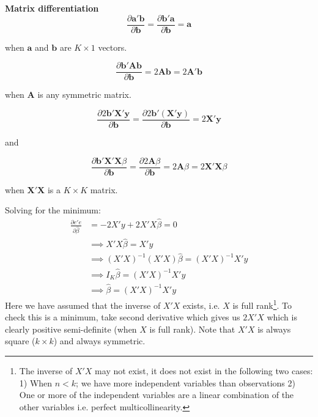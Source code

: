\documentclass[DIV=14,titlepage=false]{scrreprt}
\begin{document}
\begin{note}
    \textbf{Matrix differentiation}
\begin{equation}
\frac{\partial \mathbf{a}' \mathbf{b}}{\partial \mathbf{b}} = \frac{\partial \mathbf{b}' \mathbf{a}}{\partial \mathbf{b}} = \mathbf{a}
\end{equation}

when \(\mathbf{a}\) and \(\mathbf{b}\) are \(K \times 1\) vectors.

\begin{equation}
\frac{\partial \mathbf{b}' \mathbf{Ab}}{\partial \mathbf{b}} = 2\mathbf{Ab} = 2\mathbf{A}' \mathbf{b}
\end{equation}

when \(\mathbf{A}\) is any symmetric matrix.

\begin{equation}
\frac{\partial 2 \mathbf{b}' \mathbf{X}' \mathbf{y}}{\partial \mathbf{b}} = \frac{\partial 2 \mathbf{b}' (\mathbf{X}' \mathbf{y})}{\partial \mathbf{b}} = 2\mathbf{X}' \mathbf{y}
\end{equation}

and

\begin{equation}
\frac{\partial \mathbf{b}' \mathbf{X}' \mathbf{X}\beta}{\partial \mathbf{b}} = \frac{\partial 2 \mathbf{A}\beta}{\partial \mathbf{b}} = 2\mathbf{A}\beta = 2\mathbf{X}' \mathbf{X}\beta
\end{equation}

when \(\mathbf{X}'\mathbf{X}\) is a \(K \times K\) matrix.
\end{note}

Solving for the minimum: 
\begin{align*}
\frac{\partial e'e}{\partial \hat\beta}&=-2X'y+2X'X\hat\beta=0 \\
 &\implies X'X\hat\beta=X'y\\
 &\implies (X'X)^{-1}(X'X)\hat\beta=(X'X)^{-1}X'y\\
 &\implies I_K\hat\beta=(X'X)^{-1}X'y\\
 &\implies \hat\beta = (X'X)^{-1}X'y 
\end{align*}
Here we have assumed that the inverse of $X'X$ exists, i.e. $X$ is full rank\footnote[2]{The inverse of $X'X$ may not exist, it does not exist in the following two cases: 1) When $n < k$; we have more independent variables than observations 2) One or more of the independent variables are a linear combination of the other variables i.e. perfect multicollinearity.}. To check this is a minimum, take second derivative which gives us $2X'X$ which is clearly positive semi-definite (when $X$ is full rank). Note that $X'X$ is always square ($k \times k$) and always symmetric.\\
\end{document}
